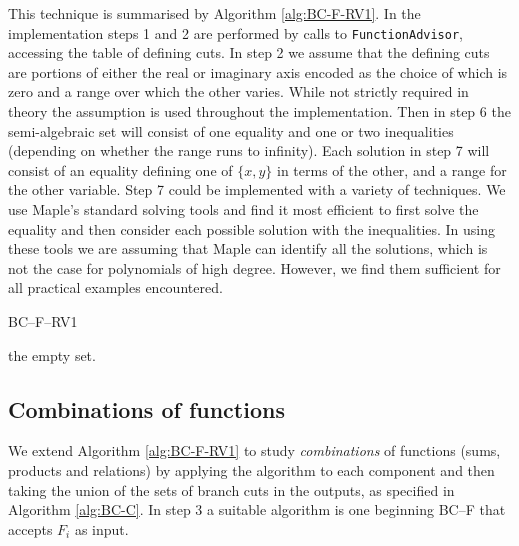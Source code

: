 \documentclass{llncs}
\begin{document}
This technique is summarised by Algorithm \ref{alg:BC-F-RV1}.  
In the implementation steps 1 and 2 are performed by calls to \texttt{FunctionAdvisor}, accessing the table of defining cuts.  In step 2 we assume that the defining cuts are portions of either the real or imaginary axis encoded as the choice of which is zero and a range over which the other varies.  While not strictly required in theory the assumption is used throughout the implementation.  Then in step 6 the semi-algebraic set will consist of one equality and one or two inequalities (depending on whether the range runs to infinity).  Each solution in step 7 will consist of an equality defining one of $\{x,y\}$ in terms of the other, and a range for the other variable.   Step 7 could be implemented with a variety of techniques.  We use {\sc Maple}'s standard solving tools and find it most efficient to first solve the equality and then consider each possible solution with the inequalities.  In using these tools we are assuming that {\sc Maple} can identify all the solutions, which is not the case for polynomials of high degree.  However, we find them sufficient for all practical examples encountered.

\begin{algorithm}[ht] \caption{BC--F--RV1} \label{alg:BC-F-RV1}
\DontPrintSemicolon
{}
\BlankLine
{}
{\Return the empty set. \;}
\end{algorithm}

\subsection{Combinations of functions}

We extend Algorithm \ref{alg:BC-F-RV1} to study {\em combinations} of functions (sums, products and relations) by applying the algorithm to each component and then taking the union of the sets of branch cuts in the outputs, as specified in Algorithm \ref{alg:BC-C}.  In step 3 a suitable algorithm is one beginning BC--F that accepts $F_i$ as input.
\end{document}
